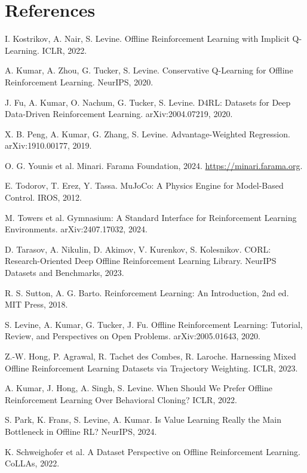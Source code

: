 \documentclass{article}
\begin{document}
\section*{References}
{\small
\begin{enumerate}[label={[\arabic*]},leftmargin=2em]
\item I. Kostrikov, A. Nair, S. Levine. Offline Reinforcement Learning with Implicit Q-Learning. ICLR, 2022.
\item A. Kumar, A. Zhou, G. Tucker, S. Levine. Conservative Q-Learning for Offline Reinforcement Learning. NeurIPS, 2020.
\item J. Fu, A. Kumar, O. Nachum, G. Tucker, S. Levine. D4RL: Datasets for Deep Data-Driven Reinforcement Learning. arXiv:2004.07219, 2020.
\item X. B. Peng, A. Kumar, G. Zhang, S. Levine. Advantage-Weighted Regression. arXiv:1910.00177, 2019.
\item O. G. Younis et al. Minari. Farama Foundation, 2024. \url{https://minari.farama.org}.
\item E. Todorov, T. Erez, Y. Tassa. MuJoCo: A Physics Engine for Model-Based Control. IROS, 2012.
\item M. Towers et al. Gymnasium: A Standard Interface for Reinforcement Learning Environments. arXiv:2407.17032, 2024.
\item D. Tarasov, A. Nikulin, D. Akimov, V. Kurenkov, S. Kolesnikov. CORL: Research-Oriented Deep Offline Reinforcement Learning Library. NeurIPS Datasets and Benchmarks, 2023.
\item R. S. Sutton, A. G. Barto. Reinforcement Learning: An Introduction, 2nd ed. MIT Press, 2018.
\item S. Levine, A. Kumar, G. Tucker, J. Fu. Offline Reinforcement Learning: Tutorial, Review, and Perspectives on Open Problems. arXiv:2005.01643, 2020.
\item Z.-W. Hong, P. Agrawal, R. Tachet des Combes, R. Laroche. Harnessing Mixed Offline Reinforcement Learning Datasets via Trajectory Weighting. ICLR, 2023.
\item A. Kumar, J. Hong, A. Singh, S. Levine. When Should We Prefer Offline Reinforcement Learning Over Behavioral Cloning? ICLR, 2022.
\item S. Park, K. Frans, S. Levine, A. Kumar. Is Value Learning Really the Main Bottleneck in Offline RL? NeurIPS, 2024.
\item K. Schweighofer et al. A Dataset Perspective on Offline Reinforcement Learning. CoLLAs, 2022.
\end{enumerate}}
\end{document}
